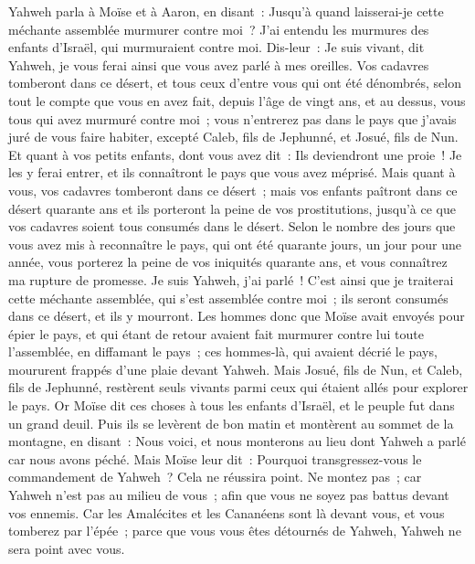 \begin{multicols}{2}
Yahweh parla à Moïse et à Aaron, en disant~:
Jusqu'à quand laisserai-je cette méchante assemblée murmurer contre moi~? J'ai entendu les murmures des enfants d'Israël, qui murmuraient contre moi.
Dis-leur~: Je suis vivant, dit Yahweh, je vous ferai ainsi que vous avez parlé à mes oreilles.
Vos cadavres tomberont dans ce désert, et tous ceux d'entre vous qui ont été dénombrés, selon tout le compte que vous en avez fait, depuis l'âge de vingt ans, et au dessus, vous tous qui avez murmuré contre moi~;
vous n'entrerez pas dans le pays que j'avais juré de vous faire habiter, excepté Caleb, fils de Jephunné, et Josué, fils de Nun.
Et quant à vos petits enfants, dont vous avez dit~: Ils deviendront une proie~! Je les y ferai entrer, et ils connaîtront le pays que vous avez méprisé.
Mais quant à vous, vos cadavres tomberont dans ce désert~;
mais vos enfants paîtront dans ce désert quarante ans et ils porteront la peine de vos prostitutions, jusqu'à ce que vos cadavres soient tous consumés dans le désert.
Selon le nombre des jours que vous avez mis à reconnaître le pays, qui ont été quarante jours, un jour pour une année, vous porterez la peine de vos iniquités quarante ans, et vous connaîtrez ma rupture de promesse.
Je suis Yahweh, j'ai parlé~! C'est ainsi que je traiterai cette méchante assemblée, qui s'est assemblée contre moi~; ils seront consumés dans ce désert, et ils y mourront.
Les hommes donc que Moïse avait envoyés pour épier le pays, et qui étant de retour avaient fait murmurer contre lui toute l'assemblée, en diffamant le pays~;
ces hommes-là, qui avaient décrié le pays, moururent frappés d'une plaie devant Yahweh.
Mais Josué, fils de Nun, et Caleb, fils de Jephunné, restèrent seuls vivants parmi ceux qui étaient allés pour explorer le pays.
Or Moïse dit ces choses à tous les enfants d'Israël, et le peuple fut dans un grand deuil.
Puis ils se levèrent de bon matin et montèrent au sommet de la montagne, en disant~: Nous voici, et nous monterons au lieu dont Yahweh a parlé car nous avons péché.
Mais Moïse leur dit~: Pourquoi transgressez-vous le commandement de Yahweh~? Cela ne réussira point.
Ne montez pas~; car Yahweh n'est pas au milieu de vous~; afin que vous ne soyez pas battus devant vos ennemis.
Car les Amalécites et les Cananéens sont là devant vous, et vous tomberez par l'épée~; parce que vous vous êtes détournés de Yahweh, Yahweh ne sera point avec vous.

\end{multicols}
